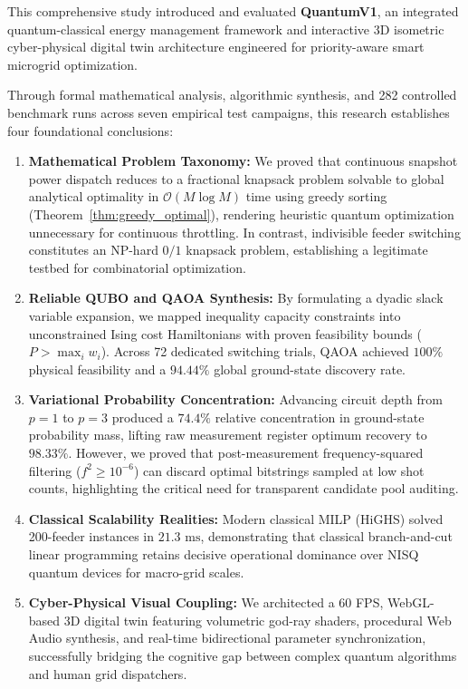 \documentclass[11pt,a4paper]{article}
\theoremstyle{definition}
\theoremstyle{remark}
\begin{document}
This comprehensive study introduced and evaluated \textbf{QuantumV1}, an integrated quantum-classical energy management framework and interactive 3D isometric cyber-physical digital twin architecture engineered for priority-aware smart microgrid optimization.

Through formal mathematical analysis, algorithmic synthesis, and 282 controlled benchmark runs across seven empirical test campaigns, this research establishes four foundational conclusions:
\begin{enumerate}
    \item \textbf{Mathematical Problem Taxonomy:} We proved that continuous snapshot power dispatch reduces to a fractional knapsack problem solvable to global analytical optimality in $\mathcal{O}(M \log M)$ time using greedy sorting (Theorem~\ref{thm:greedy_optimal}), rendering heuristic quantum optimization unnecessary for continuous throttling. In contrast, indivisible feeder switching constitutes an NP-hard $0/1$ knapsack problem, establishing a legitimate testbed for combinatorial optimization.
    \item \textbf{Reliable QUBO and QAOA Synthesis:} By formulating a dyadic slack variable expansion, we mapped inequality capacity constraints into unconstrained Ising cost Hamiltonians with proven feasibility bounds ($P > \max_i w_i$). Across 72 dedicated switching trials, QAOA achieved $100\%$ physical feasibility and a $94.44\%$ global ground-state discovery rate.
    \item \textbf{Variational Probability Concentration:} Advancing circuit depth from $p = 1$ to $p = 3$ produced a $74.4\%$ relative concentration in ground-state probability mass, lifting raw measurement register optimum recovery to $98.33\%$. However, we proved that post-measurement frequency-squared filtering ($f^2 \ge 10^{-6}$) can discard optimal bitstrings sampled at low shot counts, highlighting the critical need for transparent candidate pool auditing.
    \item \textbf{Classical Scalability Realities:} Modern classical MILP (HiGHS) solved 200-feeder instances in $21.3\text{ ms}$, demonstrating that classical branch-and-cut linear programming retains decisive operational dominance over NISQ quantum devices for macro-grid scales.
    \item \textbf{Cyber-Physical Visual Coupling:} We architected a 60 FPS, WebGL-based 3D digital twin featuring volumetric god-ray shaders, procedural Web Audio synthesis, and real-time bidirectional parameter synchronization, successfully bridging the cognitive gap between complex quantum algorithms and human grid dispatchers.
\end{enumerate}
\end{document}
